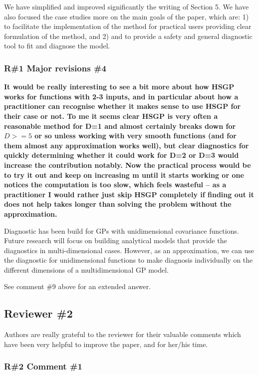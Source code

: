 \documentclass[11pt]{report}
\begin{document}
We have simplified and improved significantly the writing of Section 5. We have also focused the case studies more on the main goals of the paper, which are: 1) to facilitate the implementation of the method for practical users providing clear formulation of the method, and 2) and to provide a safety and general diagnostic tool to fit and diagnose the model.
 

\subsubsection*{R\#1 Major revisions \#4}

\textbf{It would be really interesting to see a bit more about how HSGP works for functions with 2-3 inputs, and in particular about how a practitioner can recognise whether it makes sense to use HSGP for their case or not. To me it seems clear HSGP is very often a reasonable method for D=1 and almost certainly breaks down for $D>=5$ or so unless working with very smooth functions (and for them almost any approximation works well), but clear diagnostics for quickly determining whether it could work for D=2 or D=3 would increase the contribution notably. Now the practical process would be to try it out and keep on increasing m until it starts working or one notices the computation is too slow, which feels wasteful -- as a practitioner I would rather just skip HSGP completely if finding out it does not help takes longer than solving the problem without the approximation.}

Diagnostic has been build for GPs with unidimensional covariance functions. Future research will focus on building analytical models that provide the diagnostics in multi-dimensional cases. However, as an approximation, we can use the diagnostic for unidimensional functions to make diagnosis individually on the different dimensions of a multidimensional GP model. 

See comment \#9 above for an extended answer.

\noindent \hdashrule{12.5cm}{0.2pt}{2mm 1pt}

\subsection*{Reviewer \#2}

Authors are really grateful to the reviewer for their valuable comments which have been very helpful to improve the paper, and for her/his time.

\subsubsection*{R\#2 Comment \#1}
\end{document}
